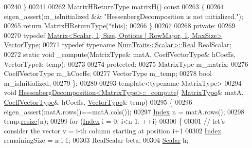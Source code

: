 \begin{DoxyCode}
00240     \}
00241 
\hyperlink{group___eigenvalues___module_a8e781d2e22a2304647bcf0ae913cc8ea}{00262}     MatrixHReturnType \hyperlink{group___eigenvalues___module_a8e781d2e22a2304647bcf0ae913cc8ea}{matrixH}()\textcolor{keyword}{ const}
00263 \textcolor{keyword}{    }\{
00264       eigen\_assert(m\_isInitialized && \textcolor{stringliteral}{"HessenbergDecomposition is not initialized."});
00265       \textcolor{keywordflow}{return} MatrixHReturnType(*\textcolor{keyword}{this});
00266     \}
00267 
00268   \textcolor{keyword}{private}:
00269 
00270     \textcolor{keyword}{typedef} \hyperlink{group___core___module}{Matrix<Scalar, 1, Size, Options | RowMajor, 1, MaxSize>}
       \hyperlink{group___core___module}{VectorType};
00271     \textcolor{keyword}{typedef} \textcolor{keyword}{typename} \hyperlink{group___core___module_struct_eigen_1_1_num_traits}{NumTraits<Scalar>::Real} RealScalar;
00272     \textcolor{keyword}{static} \textcolor{keywordtype}{void} \_compute(MatrixType& matA, CoeffVectorType& hCoeffs, VectorType& temp);
00273 
00274   \textcolor{keyword}{protected}:
00275     MatrixType m\_matrix;
00276     CoeffVectorType m\_hCoeffs;
00277     VectorType m\_temp;
00278     \textcolor{keywordtype}{bool} m\_isInitialized;
00279 \};
00280 
00293 \textcolor{keyword}{template}<\textcolor{keyword}{typename} MatrixType>
00294 \textcolor{keywordtype}{void} \hyperlink{group___eigenvalues___module_class_eigen_1_1_hessenberg_decomposition}{HessenbergDecomposition<MatrixType>::\_compute}(
      \hyperlink{group___eigenvalues___module_a93a611350a7db9d1da18f2c828ecea9f}{MatrixType}& matA, \hyperlink{group___core___module}{CoeffVectorType}& hCoeffs, \hyperlink{group___core___module}{VectorType}& temp)
00295 \{
00296   eigen\_assert(matA.rows()==matA.cols());
00297   \hyperlink{group___eigenvalues___module_a8e287ac222f53e2c8ce82faa43e95ac6}{Index} n = matA.rows();
00298   temp.\hyperlink{class_eigen_1_1_plain_object_base_a99d9054ee2d5a40c6e00ded0265e9cea}{resize}(n);
00299   \textcolor{keywordflow}{for} (\hyperlink{group___eigenvalues___module_a8e287ac222f53e2c8ce82faa43e95ac6}{Index} i = 0; i<n-1; ++i)
00300   \{
00301     \textcolor{comment}{// let's consider the vector v = i-th column starting at position i+1}
00302     \hyperlink{group___eigenvalues___module_a8e287ac222f53e2c8ce82faa43e95ac6}{Index} remainingSize = n-i-1;
00303     RealScalar beta;
00304     \hyperlink{group___eigenvalues___module_a9420c36226cae7d92da8308a3f97ac2f}{Scalar} h;

\end{DoxyCode}
